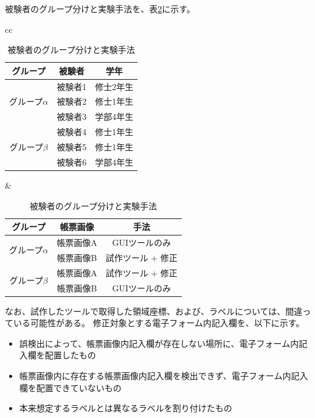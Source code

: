被験者のグループ分けと実験手法を、表\ref{tb:experiment_case}に示す。
\begin{table}[tp]
	\centering
	\caption{被験者のグループ分けと実験手法}
    \label{tb:experiment_case}
    \begin{tabular}{cc}
        \begin{minipage}[c]{0.45\hsize}
            \centering
            \begin{tabular}{c|c|c}
                グループ & 被験者 & 学年\\
                \hline \hline
                \multirow{3}{*}{グループ$\alpha$} & 被験者1 & 修士2年生\\
                                               & 被験者2 & 修士1年生\\
                                               & 被験者3 & 学部4年生\\
                                        \hline
                \multirow{3}{*}{グループ$\beta$} & 被験者4 & 修士1年生\\
                                              & 被験者5 & 修士1年生\\
                                              & 被験者6 & 学部4年生
	        \end{tabular}
        \end{minipage} &
        \begin{minipage}[c]{0.45\hsize}
            \centering
            \begin{tabular}{c|c|c}
                グループ & 帳票画像 & 手法 \\
                \hline \hline
                \multirow{2}{*}{グループ$\alpha$} & 帳票画像A & GUIツールのみ \\
                                               & 帳票画像B & 試作ツール + 修正 \\
                                        \hline
                \multirow{2}{*}{グループ$\beta$} & 帳票画像A & 試作ツール + 修正 \\
                                              & 帳票画像B & GUIツールのみ
            \end{tabular}
        \end{minipage}
    \end{tabular}
\end{table}
なお、試作したツールで取得した領域座標、および、ラベルについては、間違っている可能性がある。
修正対象とする電子フォーム内記入欄を、以下に示す。

\begin{itemize}
    \item 誤検出によって、帳票画像内記入欄が存在しない場所に、電子フォーム内記入欄を配置したもの
    \item 帳票画像内に存在する帳票画像内記入欄を検出できず、電子フォーム内記入欄を配置できていないもの
    \item 本来想定するラベルとは異なるラベルを割り付けたもの
\end{itemize}

